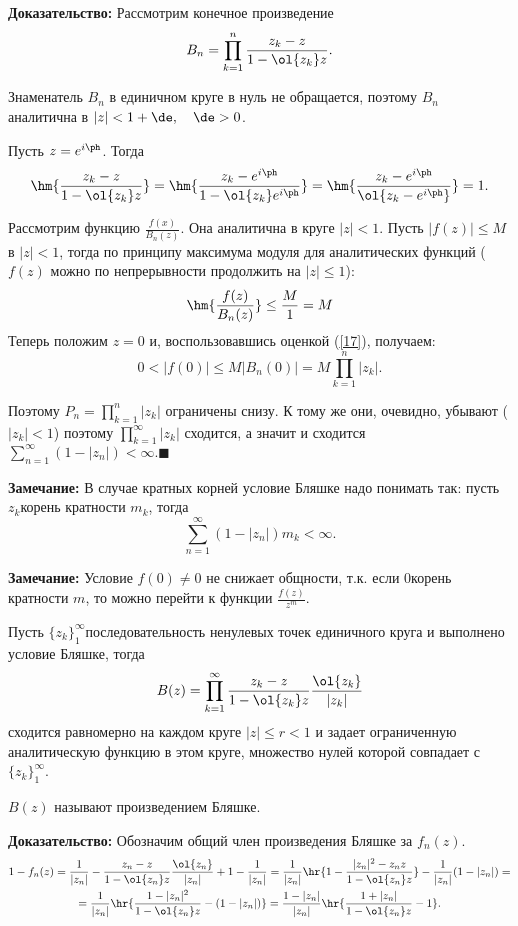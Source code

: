 \documentclass[a4paper]{article}
\begin{document}
\noindent\textbf{Доказательство:} Рассмотрим конечное произведение
$$B_n=\prod\limits_{k=1}^n\frac{z_k-z}{1-\ol{z_k}z}.$$

Знаменатель $B_n$ в единичном круге в нуль не обращается, поэтому
$B_n$ аналитична в $|z|<1+\de,\quad\de>0$.

Пусть $z=e^{i\ph}$. Тогда
$$\hm{\frac{z_k-z}{1-\ol{z_k}z}}=\hm{\frac{z_k-e^{i\ph}}{1-\ol{z_k}e^{i\ph}}}=\hm{\frac{z_k-e^{i\ph}}{\ol{z_k-e^{i\ph}}}}=1.$$

Рассмотрим функцию $\frac{f(x)}{B_n(z)}$. Она аналитична в круге
$|z|<1$. Пусть $|f(z)|\le M$ в $|z|<1$, тогда по принципу
максимума модуля для аналитических функций ($f(z)$ можно по
непрерывности продолжить на $|z|\le 1$):
\begin{equation}\label{17}
\hm{\frac{f(z)}{B_n(z)}}\le\frac M1=M
\end{equation}
Теперь положим $z=0$ и, воспользовавшись оценкой (\ref{17}),
получаем:
$$0<|f(0)|\le M|B_n(0)|=M\prod\limits_{k=1}^n |z_k|.$$

Поэтому $P_n=\prod_{k=1}^n |z_k|$ ограничены снизу. К тому же они,
очевидно, убывают ($|z_k|<1$) поэтому $\prod_{k=1}^{\infty} |z_k|$
сходится, а значит и сходится
$\sum_{n=1}^{\infty}(1-|z_n|)<\infty.\blacksquare$

\medskip\noindent\textbf{Замечание:} В случае кратных корней
условие Бляшке надо понимать так: пусть $z_k$\т корень кратности
$m_k$, тогда
$$\sum_{n=1}^{\infty}(1-|z_n|)m_k<\infty.$$

\noindent\textbf{Замечание:} Условие $f(0)\neq0$ не снижает
общности, т.к. если $0$\т корень кратности $m$, то можно перейти к
функции $\frac{f(z)}{z^m}.$

\begin{theorems}
Пусть $\{z_k\}_1^{\infty}$\т последовательность ненулевых точек
единичного круга и выполнено условие Бляшке, тогда
$$B(z)=\prod\limits_{k=1}^{\infty}\frac{z_k-z}{1-\ol{z_k}z}\frac{\ol{z_k}}{|z_k|}$$
сходится равномерно на каждом круге $|z|\le r<1$ и задает ограниченную аналитическую функцию в этом круге,
множество нулей которой совпадает с $\{z_k\}_1^{\infty}$.
\end{theorems}
$B(z)$ называют произведением Бляшке.

\noindent\textbf{Доказательство:} Обозначим общий член
произведения Бляшке за $f_n(z).$
\begin{multline*}
1-f_n(z)=\frac1{|z_n|}-\frac{z_n-z}{1-\ol{z_n}z}\frac{\ol{z_n}}{|z_n|}+1-\frac1{|z_n|}=\frac1{|z_n|}\hr{1-\frac{|z_n|^2-z_nz}{1-\ol{z_n}z}}-\frac1{|z_n|}(1-|z_n|)=\\
=\frac1{|z_n|}\hr{\frac{1-|z_n|^2}{1-\ol{z_n}z}-(1-|z_n|)}=\frac{1-|z_n|}{|z_n|}\hr{\frac{1+|z_n|}{1-\ol{z_n}z}-1}.
\end{multline*}
\end{document}
